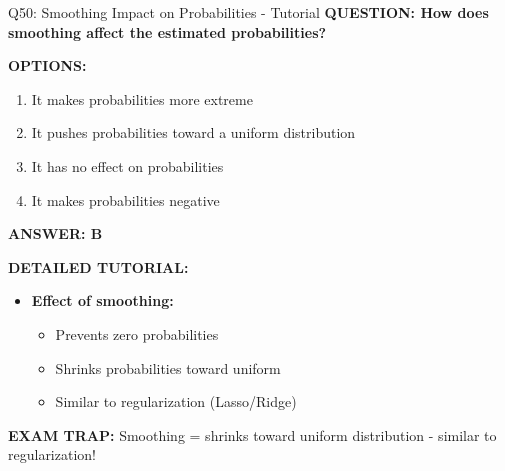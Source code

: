 \documentclass[8pt]{beamer}
\begin{document}
	\begin{frame}{Q50: Smoothing Impact on Probabilities - Tutorial}
		\fontsize{6.5}{7.5}\selectfont
		\textbf{QUESTION: How does smoothing affect the estimated probabilities?}
		
		\vspace{0.1cm}
		\textbf{OPTIONS:}
		\begin{enumerate}
			\item It makes probabilities more extreme
			\item It pushes probabilities toward a uniform distribution
			\item It has no effect on probabilities
			\item It makes probabilities negative
		\end{enumerate}
		
		\vspace{0.1cm}
		\textcolor{myblue}{\textbf{ANSWER: B}}
		
		\vspace{0.1cm}
		\textbf{DETAILED TUTORIAL:}
		\begin{itemize}
			\item \textbf{Effect of smoothing:}
			\begin{itemize}
				\item Prevents zero probabilities
				\item Shrinks probabilities toward uniform
				\item Similar to regularization (Lasso/Ridge)
			\end{itemize}
		\end{itemize}
		
		\textcolor{myred}{\textbf{EXAM TRAP:}} Smoothing = \textcolor{myblue}{shrinks toward uniform distribution} - similar to regularization!
	\end{frame}
	
\end{document}
